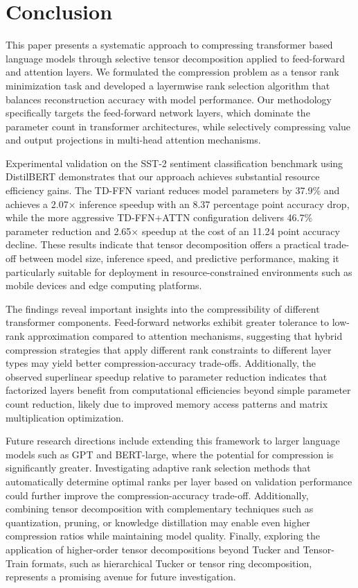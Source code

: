 \documentclass[conference]{IEEEtran}
\begin{document}

\section{Conclusion}
This paper presents a systematic approach to compressing transformer based language models through selective tensor decomposition
applied to feed-forward and attention layers. We formulated the compression problem as a tensor rank minimization task and
developed a layermwise rank selection algorithm that balances reconstruction accuracy with model performance. Our methodology
specifically targets the feed-forward network layers, which dominate the parameter count in transformer architectures, while
selectively compressing value and output projections in multi-head attention mechanisms.

Experimental validation on the SST-2 sentiment classification benchmark using DistilBERT demonstrates that our approach achieves
substantial resource efficiency gains. The TD-FFN variant reduces model parameters by 37.9\% and achieves a 2.07× inference
speedup with an 8.37 percentage point accuracy drop, while the more aggressive TD-FFN+ATTN configuration delivers 46.7\% parameter
reduction and 2.65× speedup at the cost of an 11.24 point accuracy decline. These results indicate that tensor decomposition offers
a practical trade-off between model size, inference speed, and predictive performance, making it particularly suitable for deployment
in resource-constrained environments such as mobile devices and edge computing platforms.

The findings reveal important insights into the compressibility of different transformer components. Feed-forward networks exhibit
greater tolerance to low-rank approximation compared to attention mechanisms, suggesting that hybrid compression strategies that
apply different rank constraints to different layer types may yield better compression-accuracy trade-offs. Additionally, the
observed superlinear speedup relative to parameter reduction indicates that factorized layers benefit from computational efficiencies
beyond simple parameter count reduction, likely due to improved memory access patterns and matrix multiplication optimization.

Future research directions include extending this framework to larger language models such as GPT and BERT-large, where the
potential for compression is significantly greater. Investigating adaptive rank selection methods that automatically determine
optimal ranks per layer based on validation performance could further improve the compression-accuracy trade-off. Additionally,
combining tensor decomposition with complementary techniques such as quantization, pruning, or knowledge distillation may enable
even higher compression ratios while maintaining model quality. Finally, exploring the application of higher-order tensor
decompositions beyond Tucker and Tensor-Train formats, such as hierarchical Tucker or tensor ring decomposition, represents a
promising avenue for future investigation.
\end{document}
